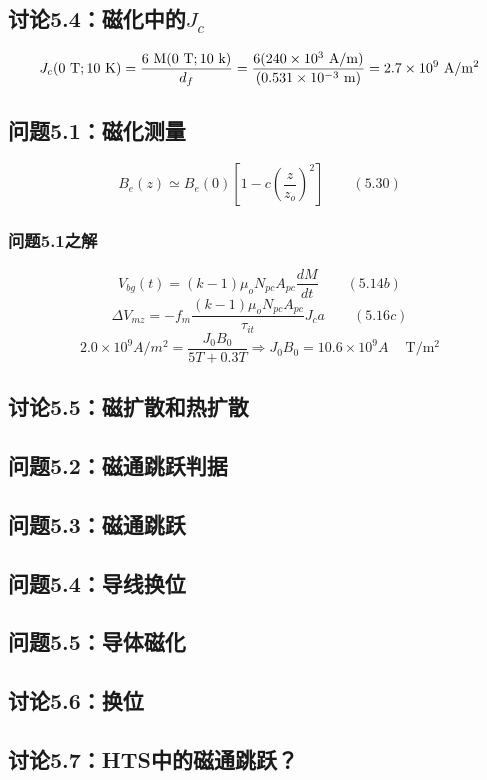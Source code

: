 \subsection{讨论5.4：磁化中的$J_c$}
\begin{equation}%
J_{c}(0\ \mathrm{T};10\ \mathrm{K})=\frac{6\ \mathrm{M}(0\ \mathrm{T};10\ \mathrm{k})}{d_{f}}\\
=\frac{6(240\times10^{3}\ \mathrm{A/m})}{(0.531\times10^{-3}\ \mathrm{m})}\\
=2.7\times10^{9}\ \mathrm{A/m^{2}}
\end{equation}


\subsection{问题5.1：磁化测量}

\begin{equation}%
B_{e}(z)\simeq B_{e}(0)[1-c(\frac{z}{z_{o}})^{2}]\qquad(5.30)
\end{equation}

\subsubsection{问题5.1之解}

\begin{equation}%
V_{bg}(t)=(k-1)\mu_{o}N_{pc}A_{pc}\frac{dM}{dt}\qquad(5.14b)
\end{equation}
\begin{equation}%
\Delta V_{mz}=-f_{m}\frac{(k-1)\mu_{o}N_{pc}A_{pc}}{\tau_{it}}J_{c}a\qquad(5.16c)
\end{equation}
\begin{equation}%
2.0\times10^{9}A/m^{2}=\frac{J_{0}B_{0}}{5T+0.3T}\Rightarrow J_{0}B_{0}=10.6\times10^{9}A\quad\ \mathrm{T/m^{2}}
\end{equation}

\subsection{讨论5.5：磁扩散和热扩散}


\subsection{问题5.2：磁通跳跃判据}


\subsection{问题5.3：磁通跳跃}


\subsection{问题5.4：导线换位}


\subsection{问题5.5：导体磁化}


\subsection{讨论5.6：换位}


\subsection{讨论5.7：HTS中的磁通跳跃？}